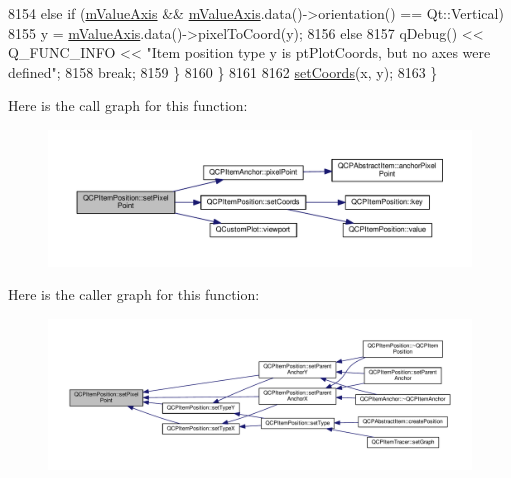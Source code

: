 \begin{DoxyCode}
8154       \textcolor{keywordflow}{else} \textcolor{keywordflow}{if} (\hyperlink{class_q_c_p_item_position_a505dc2da24ba274452c1c817fcaba011}{mValueAxis} && \hyperlink{class_q_c_p_item_position_a505dc2da24ba274452c1c817fcaba011}{mValueAxis}.data()->orientation() == Qt::Vertical)
8155         y = \hyperlink{class_q_c_p_item_position_a505dc2da24ba274452c1c817fcaba011}{mValueAxis}.data()->pixelToCoord(y);
8156       \textcolor{keywordflow}{else}
8157         qDebug() << Q\_FUNC\_INFO << \textcolor{stringliteral}{"Item position type y is ptPlotCoords, but no axes were defined"};
8158       \textcolor{keywordflow}{break};
8159     \}
8160   \}
8161   
8162   \hyperlink{class_q_c_p_item_position_aa988ba4e87ab684c9021017dcaba945f}{setCoords}(x, y);
8163 \}
\end{DoxyCode}


Here is the call graph for this function\+:\nopagebreak
\begin{figure}[H]
\begin{center}
\leavevmode
\includegraphics[width=350pt]{class_q_c_p_item_position_ab404e56d9ac2ac2df0382c57933a71ef_cgraph}
\end{center}
\end{figure}




Here is the caller graph for this function\+:\nopagebreak
\begin{figure}[H]
\begin{center}
\leavevmode
\includegraphics[width=350pt]{class_q_c_p_item_position_ab404e56d9ac2ac2df0382c57933a71ef_icgraph}
\end{center}
\end{figure}


